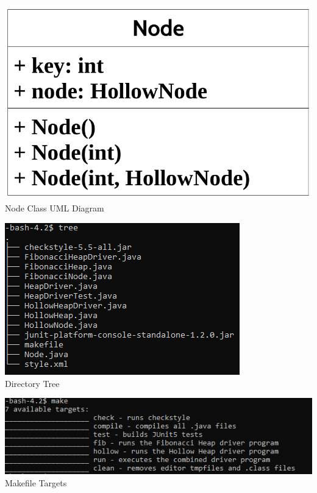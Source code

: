 \documentclass[letter,10pt]{article}
\begin{document}
\medskip

\begin{center}
	\includegraphics[scale=.24]{nodeuml.png}\\
	Node Class UML Diagram
\end{center}

\medskip

\begin{center}
	\includegraphics[]{tree.png}\\
	Directory Tree
\end{center}

\medskip

\begin{center}
	\includegraphics[]{make.png}\\
	Makefile Targets
\end{center}

\newpage
\nocite{*}
\printbibliography
\end{document}
